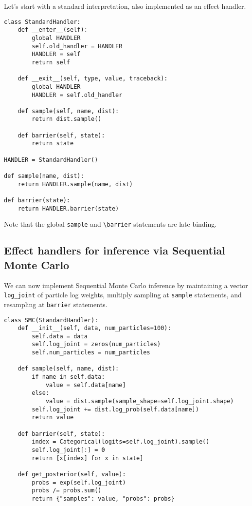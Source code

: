 \documentclass[anonymous=false, %
               format=acmsmall, %
               review=true, %
               screen=true, %
               nonacm=true]{acmart}
\begin{document}
Let's start with a standard interpretation, also implemented as an effect handler.
\begin{verbatim}
class StandardHandler:
    def __enter__(self):
        global HANDLER
        self.old_handler = HANDLER
        HANDLER = self
        return self

    def __exit__(self, type, value, traceback):
        global HANDLER
        HANDLER = self.old_handler

    def sample(self, name, dist):
        return dist.sample()

    def barrier(self, state):
        return state

HANDLER = StandardHandler()

def sample(name, dist):
    return HANDLER.sample(name, dist)

def barrier(state):
    return HANDLER.barrier(state)
\end{verbatim}
Note that the global \verb$sample$ and \verb$\barrier$ statements are late binding.

\subsection{Effect handlers for inference via Sequential Monte Carlo}
\label{sec:appendix:smc}
We can now implement Sequential Monte Carlo inference by maintaining a vector \verb$log_joint$ of particle log weights, multiply sampling at \verb$sample$ statements, and resampling at \verb$barrier$ statements.
\begin{verbatim}
class SMC(StandardHandler):
    def __init__(self, data, num_particles=100):
        self.data = data
        self.log_joint = zeros(num_particles)
        self.num_particles = num_particles

    def sample(self, name, dist):
        if name in self.data:
            value = self.data[name]
        else:
            value = dist.sample(sample_shape=self.log_joint.shape)
        self.log_joint += dist.log_prob(self.data[name])
        return value

    def barrier(self, state):
        index = Categorical(logits=self.log_joint).sample()
        self.log_joint[:] = 0
        return [x[index] for x in state]

    def get_posterior(self, value):
        probs = exp(self.log_joint)
        probs /= probs.sum()
        return {"samples": value, "probs": probs}
\end{verbatim}
\end{document}
